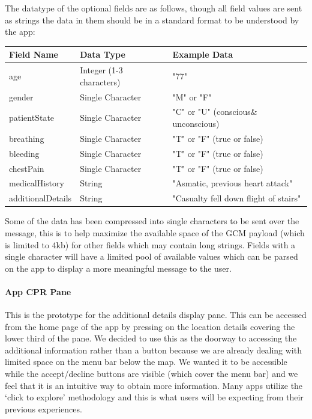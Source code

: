 \documentclass{article}
\begin{document}
The datatype of the optional fields are as follows, though all field values are sent as strings the data in them should be in a standard format to be understood by the app:
\begin{table}[h]
\begin{tabular}{|l|l|l|}
\hline
\textbf{Field Name} & \textbf{Data Type}       & \textbf{Example Data}                 \\ \hline
age                 & Integer (1-3 characters) & "77"                                  \\ \hline
gender              & Single Character         & "M" or "F"                            \\ \hline
patientState        & Single Character         & "C" or "U" (conscious\& unconscious)  \\ \hline
breathing           & Single Character         & "T" or "F" (true or false)            \\ \hline
bleeding            & Single Character         & "T" or "F" (true or false)            \\ \hline
chestPain           & Single Character         & "T" or "F" (true or false)            \\ \hline
medicalHistory      & String                   & "Asmatic, previous heart attack"      \\ \hline
additionalDetails   & String                   & "Casualty fell down flight of stairs" \\ \hline
\end{tabular}
\end{table}
Some of the data has been compressed into single characters to be sent over the message, this is to help maximize the available space of the GCM payload (which is limited to 4kb) for other fields which may contain long strings. Fields with a single character will have a limited pool of available values which can be parsed on the app to display a more meaningful message to the user. \\

\paragraph{App CPR Pane}
This is the prototype for the additional details display pane. This can be accessed from the home page of the app by pressing on the location details covering the lower third of the pane. We decided to use this as the doorway to accessing the additional information rather than a button because we are already dealing with limited space on the menu bar below the map. We wanted it to be accessible while the accept/decline buttons are visible (which cover the menu bar) and we feel that it is an intuitive way to obtain more information. Many apps utilize the ‘click to explore’ methodology and this is what users will be expecting from their previous experiences.\\
\end{document}
